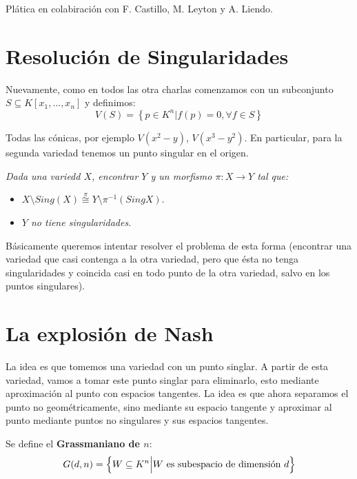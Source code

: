 \documentclass[12pt]{report}
\newcounter{it}
\theoremstyle{largebreak}
\newcommand\cf[3]{\ensuremath{#1:#2\rightarrow#3}}
\begin{document}
    Plática en colabiración con F. Castillo, M. Leyton y A. Liendo.

    \section{Resolución de Singularidades}

    Nuevamente, como en todos las otra charlas comenzamos con un subconjunto $S\subseteq K[x_1,...,x_n]$ y definimos:
    \begin{equation*}
        V(S)=\left\{p\in K^n\Big|f(p)=0,\forall f\in S \right\}
    \end{equation*}

    \begin{exa}
        Todas las cónicas, por ejemplo $V(x^2-y)$, $V(x^3-y^2)$. En particular, para la segunda variedad tenemos un punto singular en el origen.
    \end{exa}
    
    \begin{center}
        \textit{Dada una variedd $X$, encontrar $Y$ y un morfismo $\cf{\pi}{X}{Y}$ tal que:}
        \begin{itemize}
            \item $X\setminus Sing(X)\overset{\pi}{\cong} Y\setminus\pi^{-1}(Sing X)$.
            \item \textit{$Y$ no tiene singularidades.}
        \end{itemize}
    \end{center}

    Básicamente queremos intentar resolver el problema de esta forma (encontrar una variedad que casi contenga a la otra variedad, pero que ésta no tenga singularidades y coincida casi en todo punto de la otra variedad, salvo en los puntos singulares).

    \section{La explosión de Nash}

    La idea es que tomemos una variedad con un punto singlar. A partir de esta variedad, vamos a tomar este punto singlar para eliminarlo, esto mediante aproximación al punto con espacios tangentes. La idea es que ahora separamos el punto no geométricamente, sino mediante su espacio tangente y aproximar al punto mediante puntos no singulares y sus espacios tangentes.

    \begin{mydef}
        Se define el \textbf{Grassmaniano de $n$}:
        \begin{equation*}
            G(d,n)=\left\{W\subseteq K^n\Big|W\textup{ es subespacio de dimensión }d \right\}
        \end{equation*}
    \end{mydef}
\end{document}
